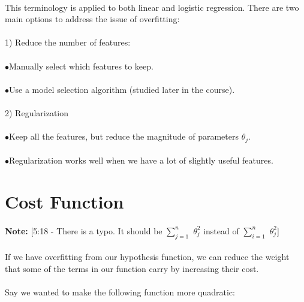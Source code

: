 \documentclass[UTF8]{ctexart}
\begin{document}
\paragraph{}
This terminology is applied to both linear and logistic regression. There are two main options to address the issue of overfitting:
\paragraph{}
1) Reduce the number of features:
\paragraph{}
$\bullet$\quad Manually select which features to keep.
\paragraph{}
$\bullet$\quad Use a model selection algorithm (studied later in the course).
\paragraph{}
2) Regularization
\paragraph{}
$\bullet$\quad Keep all the features, but reduce the magnitude of parameters $\theta_{j}$.
\paragraph{}
$\bullet$\quad Regularization works well when we have a lot of slightly useful features.
\newpage
\section{Cost Function}
\paragraph{}
\textbf{Note:} [5:18 - There is a typo. It should be $\sum_{j=1}^n$ $\theta_{j}^{2}$ instead of $\sum_{i=1}^n$ $\theta_{j}^{2}$]
\paragraph{}
If we have overfitting from our hypothesis function, we can reduce the weight that some of the terms in our function carry by increasing their cost.
\paragraph{}
Say we wanted to make the following function more quadratic:
\end{document}
